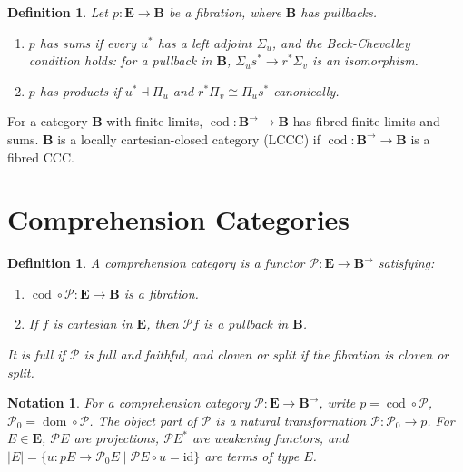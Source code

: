 \documentclass{article}
\theoremstyle{plain}
\newtheorem{notation}{Notation}
\newtheorem{definition}[theorem]{Definition}
\theoremstyle{remark}
\begin{document}
\begin{definition}
\label{def:3.10}
Let $p : \mathbf{E} \to \mathbf{B}$ be a fibration, where $\mathbf{B}$ has pullbacks.
\begin{enumerate}
    \item[(i)] $p$ \emph{has sums} if every $u^*$ has a left adjoint $\Sigma_u$, and the Beck-Chevalley condition holds: for a pullback in $\mathbf{B}$, $\Sigma_u s^* \to r^* \Sigma_v$ is an isomorphism.
    \item[(ii)] $p$ \emph{has products} if $u^* \dashv \Pi_u$ and $r^* \Pi_v \cong \Pi_u s^*$ canonically.
\end{enumerate}
\end{definition}

For a category $\mathbf{B}$ with finite limits, $\operatorname{cod} : \mathbf{B}^{\to} \to \mathbf{B}$ has fibred finite limits and sums. $\mathbf{B}$ is a locally cartesian-closed category (LCCC) if $\operatorname{cod} : \mathbf{B}^{\to} \to \mathbf{B}$ is a fibred CCC.

\section{Comprehension Categories}
\label{sec:comprehension-categories}

\begin{definition}
\label{def:4.1}
A \emph{comprehension category} is a functor $\mathscr{P} : \mathbf{E} \to \mathbf{B}^{\to}$ satisfying:
\begin{enumerate}
    \item[(i)] $\operatorname{cod} \circ \mathscr{P} : \mathbf{E} \to \mathbf{B}$ is a fibration.
    \item[(ii)] If $f$ is cartesian in $\mathbf{E}$, then $\mathscr{P} f$ is a pullback in $\mathbf{B}$.
\end{enumerate}
It is \emph{full} if $\mathscr{P}$ is full and faithful, and \emph{cloven} or \emph{split} if the fibration is cloven or split.
\end{definition}

\begin{notation}
\label{not:4.2}
For a comprehension category $\mathscr{P} : \mathbf{E} \to \mathbf{B}^{\to}$, write $p = \operatorname{cod} \circ \mathscr{P}$, $\mathscr{P}_0 = \operatorname{dom} \circ \mathscr{P}$. The object part of $\mathscr{P}$ is a natural transformation $\mathscr{P} : \mathscr{P}_0 \to p$. For $E \in \mathbf{E}$, $\mathscr{P} E$ are \emph{projections}, $\mathscr{P} E^*$ are \emph{weakening functors}, and $|E| = \{ u : p E \to \mathscr{P}_0 E \mid \mathscr{P} E \circ u = \text{id} \}$ are \emph{terms} of type $E$.
\end{notation}
\end{document}
